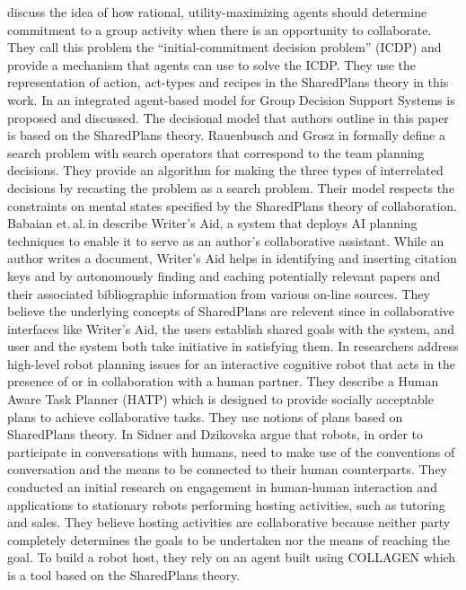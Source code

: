 \documentclass[12pt]{report}
\begin{document}
discuss the idea of how rational, utility-maximizing agents should determine
commitment to a group activity when there is an opportunity to collaborate. They
call this problem the ``initial-commitment decision problem'' (ICDP) and provide
a mechanism that agents can use to solve the ICDP. They use the representation
of action, act-types and recipes in the SharedPlans theory in this work. In
\cite{zamfirescu:gdss} an integrated agent-based model for Group Decision
Support Systems is proposed and discussed. The decisional model that authors
outline in this paper is based on the SharedPlans theory. Rauenbusch and Grosz
in \cite{rauenbusch:decision-making-planning} formally define a search problem
with search operators that correspond to the team planning decisions. They
provide an algorithm for making the three types of interrelated decisions by
recasting the problem as a search problem. Their model respects the constraints
on mental states specified by the SharedPlans theory of collaboration. Babaian
et.\,al.\,in \cite{babaian:writers-assistant} describe Writer's Aid, a system
that deploys AI planning techniques to enable it to serve as an author's
collaborative assistant. While an author writes a document, Writer's Aid helps
in identifying and inserting citation keys and by autonomously finding and
caching potentially relevant papers and their associated bibliographic
information from various on-line sources. They believe the underlying concepts
of SharedPlans are relevent since in collaborative interfaces like Writer’s Aid,
the users establish shared goals with the system, and user and the system both
take initiative in satisfying them. In \cite{montreuil:planning-robot-activity}
researchers address high-level robot planning issues for an interactive
cognitive robot that acts in the presence of or in collaboration with a human
partner. They describe a Human Aware Task Planner (HATP) which is designed to
provide socially acceptable plans to achieve collaborative tasks. They use
notions of plans based on SharedPlans theory. In \cite{sidner:enagagement-robot}
Sidner and Dzikovska argue that robots, in order to participate in conversations
with humans, need to make use of the conventions of conversation and the means
to be connected to their human counterparts. They conducted an initial research
on engagement in human-human interaction and applications to stationary robots
performing hosting activities, such as tutoring and sales. They believe hosting
activities are collaborative because neither party completely determines the
goals to be undertaken nor the means of reaching the goal. To build a robot
host, they rely on an agent built using COLLAGEN which is a tool based on the
SharedPlans theory.\\
\end{document}
